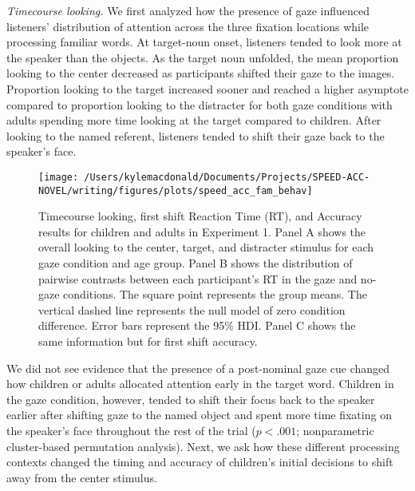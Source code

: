 \documentclass[oneside]{report}
\begin{document}
\emph{Timecourse looking.} We first analyzed how the presence of gaze
influenced listeners' distribution of attention across the three
fixation locations while processing familiar words. At target-noun
onset, listeners tended to look more at the speaker than the objects. As
the target noun unfolded, the mean proportion looking to the center
decreased as participants shifted their gaze to the images. Proportion
looking to the target increased sooner and reached a higher asymptote
compared to proportion looking to the distracter for both gaze
conditions with adults spending more time looking at the target compared
to children. After looking to the named referent, listeners tended to
shift their gaze back to the speaker's face.
\begin{figure}[!t]

{\centering \texttt{[image: /Users/kylemacdonald/Documents/Projects/SPEED-ACC-NOVEL/writing/figures/plots/speed\_acc\_fam\_behav]} 

}

\caption[Behavioral results for Experiment 5.1.]{Timecourse looking, first shift Reaction Time (RT), and Accuracy results for children and adults in Experiment 1. Panel A shows the overall looking to the center, target, and distracter stimulus for each gaze condition and age group. Panel B shows the distribution of pairwise contrasts between each participant's RT in the gaze and no-gaze conditions. The square point represents the group means. The vertical dashed line represents the null model of zero condition difference. Error bars represent the 95\% HDI. Panel C shows the same information but for first shift accuracy.}\label{fig:speed-acc-gaze-results}
\end{figure}
We did not see evidence that the presence of a post-nominal gaze cue
changed how children or adults allocated attention early in the target
word. Children in the gaze condition, however, tended to shift their
focus back to the speaker earlier after shifting gaze to the named
object and spent more time fixating on the speaker's face throughout the
rest of the trial (\(p < .001\); nonparametric cluster-based permutation
analysis). Next, we ask how these different processing contexts changed
the timing and accuracy of children's initial decisions to shift away
from the center stimulus.
\end{document}
